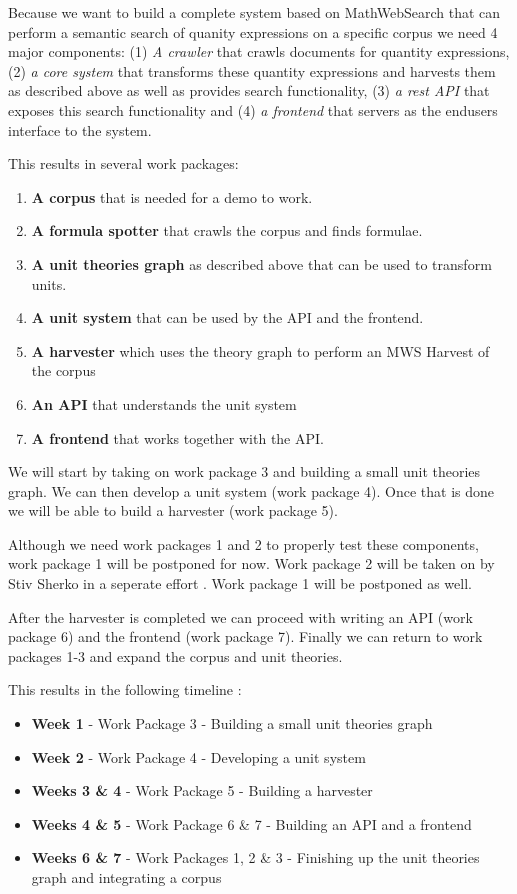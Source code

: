 \documentclass[11pt]{article}
\begin{document}
Because we want to build a complete system based on MathWebSearch that can perform a semantic search of quanity expressions on a specific corpus we need 4 major components: (1) \textit{A crawler} that crawls documents for quantity expressions, (2) \textit{a core system} that transforms these quantity expressions and harvests them as described above as well as provides search functionality, (3) \textit{a rest API} that exposes this search functionality and (4) \textit{a frontend} that servers as the endusers interface to the system.

This results in several work packages:

\begin{enumerate}
  \item \textbf{A corpus} that is needed for a demo to work.
  \item \textbf{A formula spotter} that crawls the corpus and finds formulae.
  \item \textbf{A unit theories graph} as described above that can be used to transform units.
  \item \textbf{A unit system} that can be used by the API and the frontend.
  \item \textbf{A harvester} which uses the theory graph to perform an MWS Harvest of the corpus
  \item \textbf{An API} that understands the unit system
  \item \textbf{A frontend} that works together with the API.
\end{enumerate}

We will start by taking on work package 3 and building a small unit theories graph. We can then develop a unit system (work package 4). Once that is done we will be able to build a harvester (work package 5).

Although we need work packages 1 and 2 to properly test these components, work package 1 will be postponed for now. Work package 2 will be taken on by Stiv Sherko in a seperate effort \cite{proposal:sharko}. Work package 1 will be postponed as well.

After the harvester is completed we can proceed with writing an API (work package 6) and the frontend (work package 7). Finally we can return to work packages 1-3 and expand the corpus and unit theories.

This results in the following timeline :
\begin{itemize}
  \item \textbf{Week 1} - Work Package 3 - Building a small unit theories graph
  \item \textbf{Week 2} - Work Package 4 - Developing a unit system
  \item \textbf{Weeks 3 \& 4} - Work Package 5 - Building a harvester
  \item \textbf{Weeks 4 \& 5} - Work Package 6 \& 7 - Building an API and a frontend
  \item \textbf{Weeks 6 \& 7} - Work Packages 1, 2 \& 3 - Finishing up the unit theories graph and integrating a corpus
\end{itemize}
\end{document}

